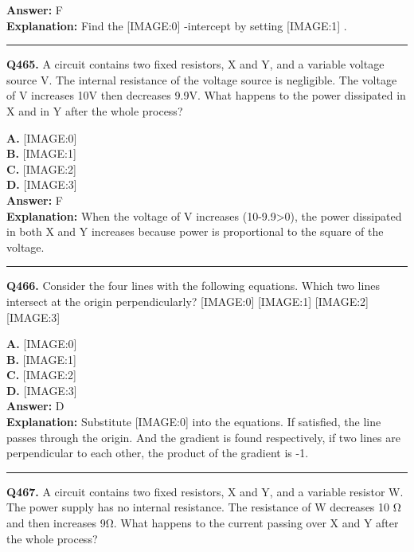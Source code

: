 \documentclass[12pt]{article}
\begin{document}
\textbf{Answer:} F \\
\textbf{Explanation:} Find the
[IMAGE:0]
-intercept by setting
[IMAGE:1]
.

\hrule
\vspace{1em}


\noindent
\textbf{Q465.} A circuit contains two fixed resistors, X and Y, and a variable voltage source V. The internal resistance of the voltage source is negligible.
The voltage of V increases 10V then decreases 9.9V. What happens to the power dissipated in X and in Y after the whole process?



\textbf{A.} [IMAGE:0] \\
\textbf{B.} [IMAGE:1] \\
\textbf{C.} [IMAGE:2] \\
\textbf{D.} [IMAGE:3] \\

\textbf{Answer:} F \\
\textbf{Explanation:} When the voltage of V increases (10-9.9>0), the power dissipated in both X and Y increases because power is proportional to the square of the voltage.

\hrule
\vspace{1em}


\noindent
\textbf{Q466.} Consider the four lines with the following equations.
Which two lines intersect at the origin perpendicularly?
[IMAGE:0]
[IMAGE:1]
[IMAGE:2]
[IMAGE:3]



\textbf{A.} [IMAGE:0] \\
\textbf{B.} [IMAGE:1] \\
\textbf{C.} [IMAGE:2] \\
\textbf{D.} [IMAGE:3] \\

\textbf{Answer:} D \\
\textbf{Explanation:} Substitute
[IMAGE:0]
into the equations. If satisfied, the line passes through the origin.
And the gradient is found respectively, if two lines are perpendicular to each other, the product of the gradient is -1.

\hrule
\vspace{1em}


\noindent
\textbf{Q467.} A circuit contains two fixed resistors, X and Y, and a variable resistor W. The power supply has no internal resistance.
The resistance of W decreases 10 Ω and then increases 9Ω. What happens to the current passing over X and Y after the whole process?
\end{document}
